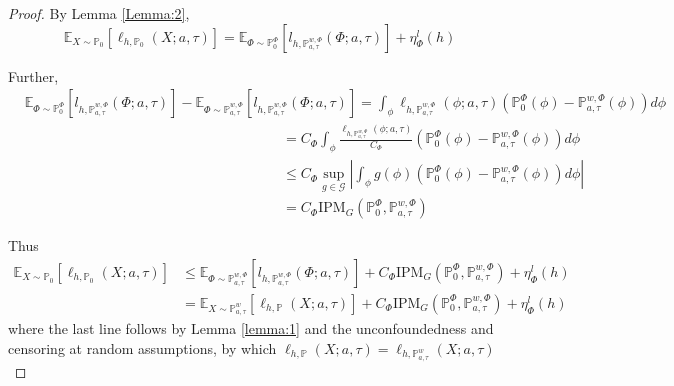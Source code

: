 \documentclass{article}
\newcommand{\IPM}{\text{IPM}}
\begin{document}
\begin{proof}
By Lemma \ref{Lemma:2},  
\begin{equation*}
    \mathbb{E}_{X \sim \mathbb{P}_0}[\ell_{h, \mathbb{P}_0}(X; a, \tau)] =  \mathbb{E}_{\Phi \sim \mathbb{P}^\Phi_0}[l_{h, \mathbb{P}^{w, \Phi}_{a, \tau}}(\Phi; a, \tau)] + \eta^l_\Phi(h)
\end{equation*}

Further, 
\begin{equation*}
\begin{split}
    &\mathbb{E}_{\Phi \sim \mathbb{P}^\Phi_0}[ l_{h, \mathbb{P}^{w, \Phi}_{a, \tau}}(\Phi; a, \tau)] -  \mathbb{E}_{\Phi \sim \mathbb{P}^{w, \Phi}_{a, \tau}}[ l_{h, \mathbb{P}^{w, \Phi}_{a, \tau}}(\Phi; a, \tau)] = \int_{\phi} \ell_{h, \mathbb{P}^{w, \Phi}_{a, \tau}}(\phi; a, \tau) (\mathbb{P}^\Phi_0(\phi) - \mathbb{P}^{w, \Phi}_{a, \tau}(\phi))d\phi \\
    &\qquad\qquad\qquad\qquad~~~~~~~~~~~~~~~~~~~~~~~~~~~~~~~~~~~~~~~~~~~~~~~= C_\Phi\int_{\phi} \frac{\ell_{h, \mathbb{P}^{w, \Phi}_{a, \tau}}(\phi; a, \tau)}{C_\Phi} (\mathbb{P}^\Phi_0(\phi) - \mathbb{P}^{w, \Phi}_{a, \tau}(\phi))d\phi \\
     &\qquad\qquad\qquad\qquad~~~~~~~~~~~~~~~~~~~~~~~~~~~~~~~~~~~~~~~~~~~~~~~\leq C_\Phi \sup_{g \in \mathcal{G}} \left|\int_{\phi} g(\phi) (\mathbb{P}^\Phi_0(\phi) - \mathbb{P}^{w, \Phi}_{a, \tau}(\phi))d\phi\right| \\
    &\qquad\qquad\qquad\qquad~~~~~~~~~~~~~~~~~~~~~~~~~~~~~~~~~~~~~~~~~~~~~~~= C_\Phi \IPM_G(\mathbb{P}^{\Phi}_0, \mathbb{P}^{w, \Phi}_{a, \tau})
\end{split}
\end{equation*}

Thus 
\begin{equation*}
\begin{split}
    \mathbb{E}_{X \sim \mathbb{P}_0}[\ell_{h, \mathbb{P}_0}(X; a, \tau)] &\leq \mathbb{E}_{\Phi \sim \mathbb{P}^{w, \Phi}_{a, \tau}}[ l_{h, \mathbb{P}^{w, \Phi}_{a, \tau}}(\Phi; a, \tau)] + C_\Phi \IPM_G(\mathbb{P}^{\Phi}_0, \mathbb{P}^{w, \Phi}_{a, \tau}) + \eta^l_\Phi(h) \\
    &=\mathbb{E}_{X \sim \mathbb{P}^{w}_{a, \tau}}[ \ell_{h, \mathbb{P}}(X; a, \tau)] + C_\Phi \IPM_G(\mathbb{P}^{\Phi}_0, \mathbb{P}^{w, \Phi}_{a, \tau}) + \eta^l_\Phi(h)
    \end{split}
\end{equation*}
where the last line follows by Lemma \ref{lemma:1} and the unconfoundedness and censoring at random assumptions, by which $ \ell_{h, \mathbb{P}}(X; a, \tau)= \ell_{h, \mathbb{P}^w_{a, \tau}}(X; a, \tau)$


\end{proof}
\end{document}

